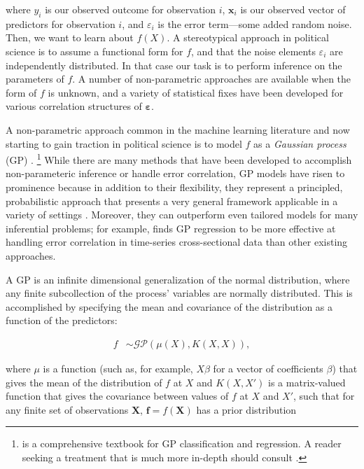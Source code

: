 \documentclass{draft}
\begin{document}
\noindent
where \( y_i \) is our observed outcome for observation \( i \),
\( \mathbf{x}_i \) is our observed vector of predictors for observation \( i \),
and \( \varepsilon_i \) is the error term---some added random noise.
Then, we want to learn about \( f \left( X \right) \).
A stereotypical approach in political science is to assume a functional form for \( f \),
and that the noise elements \( \varepsilon_i \) are independently distributed.
In that case our task is to perform inference on the parameters of \( f \).
A number of non-parametric approaches are available when the form of \( f \) is unknown,
and a variety of statistical fixes have been developed for various correlation structures of \( \boldsymbol\varepsilon \).

A non-parametric approach common in the machine learning literature and now starting to gain traction in political science
is to model \( f \) as a \emph{Gaussian process} (GP) \citep{RasmussenWilliams2006Gaussian}.%
\footnote{
    \citet{RasmussenWilliams2006Gaussian} is a comprehensive textbook for GP classification and regression.
    A reader seeking a treatment that is much more in-depth should consult \citet{RasmussenWilliams2006Gaussian}.
}
While there are many methods that have been developed to accomplish non-parameteric inference or handle error correlation,
GP models have risen to prominence because in addition to their flexibility,
they represent a principled, probabilistic approach
that presents a very general framework applicable in a variety of settings \citep{ChengEtAl2019additive}.
Moreover, they can outperform even tailored models for many inferential problems;
for example, \citet{Carlson2020Modeling} finds GP regression to be more effective at handling error correlation
in time-series cross-sectional data than other existing approaches.

A GP is an infinite dimensional generalization of the normal distribution,
where any finite subcollection of the process' variables are normally distributed.
This is accomplished by specifying the mean and covariance of the distribution as a function of the predictors:

\vspace*{-\baselineskip}
\begin{align}
    f & \sim \mathcal{GP} \left( \mu \left( X \right), K \left( X, X \right) \right),
\end{align}

\noindent
where \( \mu \) is a function (such as, for example, \( X\beta \) for a vector of coefficients \( \beta \))
that gives the mean of the distribution of \( f \) at \( X \) and
\( K \left( X, X' \right) \) is a matrix-valued function that gives the covariance between values of \( f \) at \( X \) and \( X' \),
such that for any finite set of observations \( \mathbf{X} \), \( \mathbf{f} = f \left( \mathbf{X} \right) \) has a prior distribution
\end{document}
